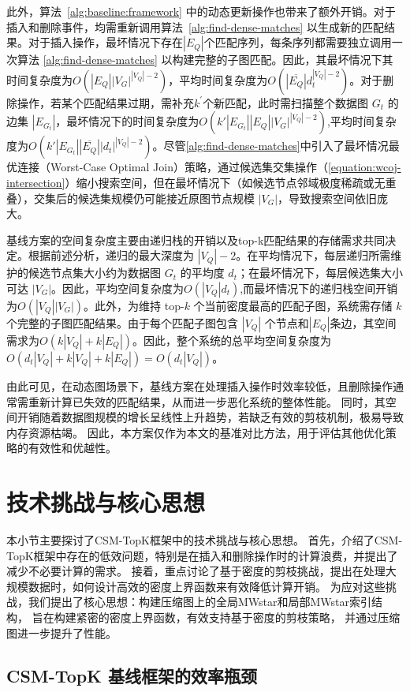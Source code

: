 此外，算法~\ref{alg:baseline:framework} 中的动态更新操作也带来了额外开销。对于插入和删除事件，均需重新调用算法~\ref{alg:find-dense-matches} 以生成新的匹配结果。对于插入操作，最坏情况下存在$|E_Q|$个匹配序列，每条序列都需要独立调用一次算法 \ref{alg:find-dense-matches} 以构建完整的子图匹配。因此，其最坏情况下其时间复杂度为$O(|E_Q||V_G|^{|V_Q|-2})$，平均时间复杂度为$O(|\overline{E_Q}|d_t^{|V_Q|-2})$。对于删除操作，若某个匹配结果过期，需补充$k^{\prime}$个新匹配，此时需扫描整个数据图 $G_t$ 的边集 $|E_{G_t}|$，最坏情况下的时间复杂度为$O(k' |E_{G_t}|  |E_Q|  |V_G|^{|V_Q|-2})$,平均时间复杂度为$O(k' |E_{G_t}|  |\overline{E_Q}| |d_t|^{|V_Q|-2})$。尽管\ref{alg:find-dense-matches}中引入了最坏情况最优连接（Worst-Case Optimal Join）策略，通过候选集交集操作（\ref{equation:wcoj-intersection}）缩小搜索空间，但在最坏情况下（如候选节点邻域极度稀疏或无重叠），交集后的候选集规模仍可能接近原图节点规模 $|V_G|$，导致搜索空间依旧庞大。

基线方案的空间复杂度主要由递归栈的开销以及top-k匹配结果的存储需求共同决定。根据前述分析，递归的最大深度为 $|V_Q| - 2$。在平均情况下，每层递归所需维护的候选节点集大小约为数据图 $G_t$ 的平均度 $d_t$；在最坏情况下，每层候选集大小可达 $|V_G|$。因此，平均空间复杂度为$O(|V_Q|d_t)$,而最坏情况下的递归栈空间开销为$O(|V_Q||V_G|)$。此外，为维持 top-$k$ 个当前密度最高的匹配子图，系统需存储 $k$ 个完整的子图匹配结果。由于每个匹配子图包含 $|V_Q|$ 个节点和$|E_Q|$条边，其空间需求为$O(k|V_Q|+k|E_Q|)$。因此，整个系统的总平均空间复杂度为$O(d_t|V_Q|+k|V_Q|+k|E_Q|)=O(d_t|V_Q|)$。

由此可见，在动态图场景下，基线方案在处理插入操作时效率较低，且删除操作通常需重新计算已失效的匹配结果，从而进一步恶化系统的整体性能。
同时，其空间开销随着数据图规模的增长呈线性上升趋势，若缺乏有效的剪枝机制，极易导致内存资源枯竭。
因此，本方案仅作为本文的基准对比方法，用于评估其他优化策略的有效性和优越性。




\section{技术挑战与核心思想}
本小节主要探讨了CSM-TopK框架中的技术挑战与核心思想。
首先，介绍了CSM-TopK框架中存在的低效问题，特别是在插入和删除操作时的计算浪费，并提出了减少不必要计算的需求。
接着，重点讨论了基于密度的剪枝挑战，提出在处理大规模数据时，如何设计高效的密度上界函数来有效降低计算开销。
为应对这些挑战，我们提出了核心思想：构建压缩图上的全局MWstar和局部MWstar索引结构，  旨在构建紧密的密度上界函数，有效支持基于密度的剪枝策略，
并通过压缩图进一步提升了性能。
\subsection{CSM-TopK 基线框架的效率瓶颈}

